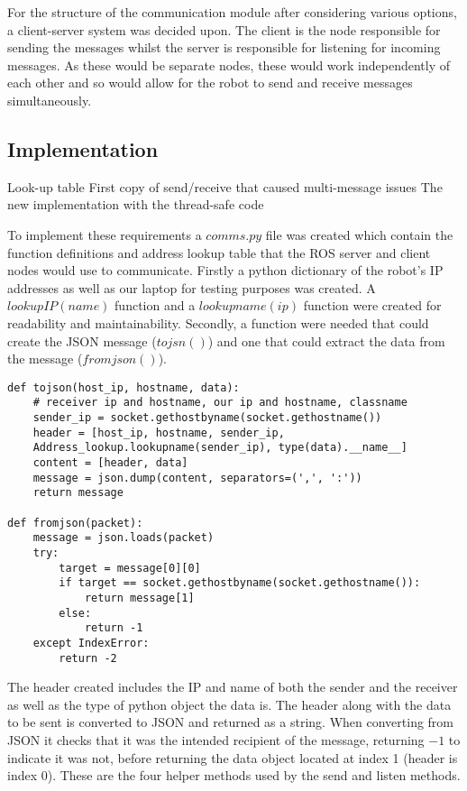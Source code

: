 For the structure of the communication module after considering various options,
a client-server system was decided upon. The client is the node
responsible for sending the messages whilst the server is responsible
for listening for incoming messages. As these would be separate nodes,
these would work independently of each other and so would allow for the
robot to send and receive messages simultaneously.

\subsection{Implementation}\label{soft/comms/impl}
Look-up table
First copy of send/receive that caused multi-message issues
The new implementation with the thread-safe code

To implement these requirements a $comms.py$ file was created which contain
the function definitions and address lookup table that the ROS server and
client nodes would use to communicate. Firstly a python dictionary of the
robot's IP addresses as well as our laptop for testing purposes was created.
A $lookupIP(name)$ function and a $lookupname(ip)$ function were created for
readability and maintainability. Secondly, a function were needed that could
create the JSON message ($tojsn()$) and one that could extract the data from
the message ($fromjson()$).

\begin{lstlisting}
def tojson(host_ip, hostname, data):
    # receiver ip and hostname, our ip and hostname, classname
    sender_ip = socket.gethostbyname(socket.gethostname())
    header = [host_ip, hostname, sender_ip,
    Address_lookup.lookupname(sender_ip), type(data).__name__]
    content = [header, data]
    message = json.dump(content, separators=(',', ':'))
    return message

def fromjson(packet):
    message = json.loads(packet)
    try:
        target = message[0][0]
        if target == socket.gethostbyname(socket.gethostname()):
            return message[1]
        else:
            return -1
    except IndexError:
        return -2
\end{lstlisting}
The header created includes the IP and name of both the sender and the
receiver as well as the type of python object the data is. The header along
with the data to be sent is converted to JSON and returned as a string. When  converting from JSON it checks that it was the intended recipient of the
message, returning $-1$ to indicate it was not, before returning the data
object located at index 1 (header is index 0). These are the four helper
methods used by the send and listen methods.


